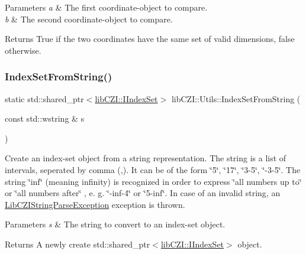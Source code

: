 \begin{DoxyParams}{Parameters}
{\em a} & The first coordinate-\/object to compare. \\
\hline
{\em b} & The second coordinate-\/object to compare.\\
\hline
\end{DoxyParams}
\begin{DoxyReturn}{Returns}
True if the two coordinates have the same set of valid dimensions, false otherwise. 
\end{DoxyReturn}
\mbox{\label{classlib_c_z_i_1_1_utils_a69fdbdc41c4700f35a648a516757bbca}} 
\subsubsection{\texorpdfstring{Index\+Set\+From\+String()}{IndexSetFromString()}}
{\footnotesize\ttfamily static std\+::shared\+\_\+ptr$<$\hyperlink{classlib_c_z_i_1_1_i_index_set}{lib\+C\+Z\+I\+::\+I\+Index\+Set}$>$ lib\+C\+Z\+I\+::\+Utils\+::\+Index\+Set\+From\+String (\begin{DoxyParamCaption}\item[{const std\+::wstring \&}]{s }\end{DoxyParamCaption})\hspace{0.3cm}{\ttfamily [static]}}

Create an index-\/set object from a string representation. The string is a list of intervals, seperated by comma (\textquotesingle{},\textquotesingle{}). It can be of the form \char`\"{}5\char`\"{}, \char`\"{}17\char`\"{}, \char`\"{}3-\/5\char`\"{}, \char`\"{}-\/3-\/5\char`\"{}. The string \char`\"{}inf\char`\"{} (meaning \textquotesingle{}infinity\textquotesingle{}) is recognized in order to express \char`\"{}all numbers up to\char`\"{} or \char`\"{}all numbers after\char`\"{} , e. g. \char`\"{}-\/inf-\/4\char`\"{} or \char`\"{}5-\/inf\char`\"{}. In case of an invalid string, an \hyperlink{classlib_c_z_i_1_1_lib_c_z_i_string_parse_exception}{Lib\+C\+Z\+I\+String\+Parse\+Exception} exception is thrown. 
\begin{DoxyParams}{Parameters}
{\em s} & The string to convert to an index-\/set object. \\
\hline
\end{DoxyParams}
\begin{DoxyReturn}{Returns}
A newly create std\+::shared\+\_\+ptr$<$\hyperlink{classlib_c_z_i_1_1_i_index_set}{lib\+C\+Z\+I\+::\+I\+Index\+Set}$>$ object. 
\end{DoxyReturn}
\mbox{\label{classlib_c_z_i_1_1_utils_af19f5d15750c0949f3dd4ebb5684c7d3}} 
